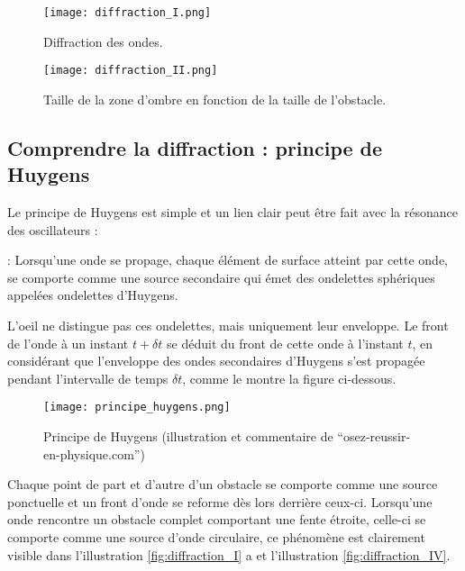 \begin{figure}[h]
    \begin{minipage}{.5\textwidth}
        \centering
        \texttt{[image: diffraction\_I.png]}
        \caption{Diffraction des ondes.}
        \label{fig:diffraction_I}
    \end{minipage}
    \begin{minipage}{.5\textwidth}
        \centering
        \texttt{[image: diffraction\_II.png]}
        \caption{Taille de la zone d'ombre en fonction de la taille de l'obstacle.}
        \label{fig:diffraction_II}
    \end{minipage}
\end{figure}

\newpage

\subsection{Comprendre la diffraction : principe de Huygens}
Le principe de Huygens est simple et un lien clair peut être fait avec la résonance des oscillateurs :
\begin{encadre}
     : Lorsqu'une onde se propage, chaque élément de surface atteint par cette onde, se comporte comme une source secondaire qui émet des ondelettes sphériques appelées ondelettes d'Huygens.
\end{encadre}
L'oeil ne distingue pas ces ondelettes, mais uniquement leur enveloppe. Le front de l'onde à un instant \(t+\delta t\) se déduit du front de cette onde à l'instant \(t\), en considérant que l'enveloppe des ondes secondaires d'Huygens s'est propagée pendant l'intervalle de temps \(\delta t\), comme le montre la figure ci-dessous.

\begin{figure}[h]
    \centering
    \texttt{[image: principe\_huygens.png]}
    \caption{Principe de Huygens (illustration et commentaire de \enquote{osez-reussir-en-physique.com})}
\end{figure}

Chaque point de part et d'autre d'un obstacle se comporte comme une source ponctuelle et un front d'onde se reforme dès lors derrière ceux-ci.
Lorsqu'une onde rencontre un obstacle complet comportant une fente étroite, celle-ci se comporte comme une source d'onde circulaire, ce phénomène est clairement visible dans l'illustration \ref{fig:diffraction_I} a et l'illustration \ref{fig:diffraction_IV}.

